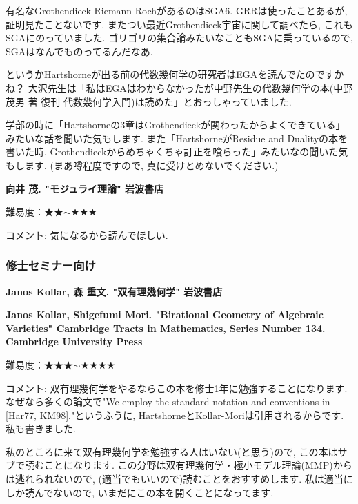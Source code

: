 有名なGrothendieck-Riemann-RochがあるのはSGA6. GRRは使ったことあるが, 証明見たことないです. 
またつい最近Grothendieck宇宙に関して調べたら, これもSGAにのっていました. ゴリゴリの集合論みたいなこともSGAに乗っているので, SGAはなんでものってるんだなあ.

というかHartshorneが出る前の代数幾何学の研究者はEGAを読んでたのですかね？ 
大沢先生は「私はEGAはわからなかったが中野先生の代数幾何学の本(中野茂男 著 復刊 代数幾何学入門)は読めた」とおっしゃっていました. 

学部の時に「Hartshorneの3章はGrothendieckが関わったからよくできている」みたいな話を聞いた気もします. また「HartshorneがResidue and Dualityの本を書いた時, Grothendieckからめちゃくちゃ訂正を喰らった」みたいなの聞いた気もします. (まあ噂程度ですので, 真に受けとめないでください.)

\vspace{8pt}



\textbf{向井 茂. "モジュライ理論" 岩波書店}

難易度：★★$\sim$★★★  \vspace{-6pt}

コメント: 気になるから読んでほしい. 

\subsubsection{修士セミナー向け}

\textbf{Janos Kollar, 森 重文. "双有理幾何学" 岩波書店} \vspace{-6pt}

\textbf{Janos Kollar, Shigefumi Mori. "Birational Geometry of Algebraic Varieties" Cambridge Tracts in Mathematics, Series Number 134. Cambridge University Press} \vspace{-6pt}

難易度：★★★$\sim$★★★★\vspace{-6pt} 

コメント: 双有理幾何学をやるならこの本を修士1年に勉強することになります. なぜなら多くの論文で"We employ the standard notation and conventions in [Har77, KM98]."というふうに, HartshorneとKollar-Moriは引用されるからです. 私も書きました. 

私のところに来て双有理幾何学を勉強する人はいない(と思う)ので, この本はサブで読むことになります. 
 この分野は双有理幾何学・極小モデル理論(MMP)からは逃れられないので, (適当でもいいので)読むことをおすすめします. 私は適当にしか読んでないので, いまだにこの本を開くことになってます. 
 \vspace{8pt}
 
